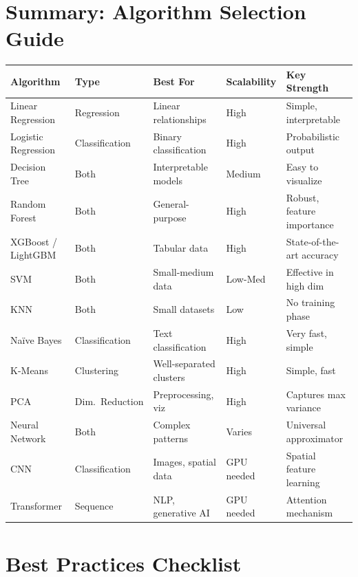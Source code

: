 \documentclass[11pt,a4paper]{article}
\begin{document}
\section{Summary: Algorithm Selection Guide}

\begin{center}
\small
{}
\begin{longtable}{@{}p{2.8cm}p{2.2cm}p{2.5cm}p{2cm}p{3.5cm}@{}}
\toprule
\rowcolor{primary!15}
\textbf{Algorithm} & \textbf{Type} & \textbf{Best For} & \textbf{Scalability} & \textbf{Key Strength} \\
\midrule
\endhead
Linear Regression & Regression & Linear relationships & High & Simple, interpretable \\
Logistic Regression & Classification & Binary classification & High & Probabilistic output \\
\addlinespace
Decision Tree & Both & Interpretable models & Medium & Easy to visualize \\
Random Forest & Both & General-purpose & High & Robust, feature importance \\
\addlinespace
XGBoost / LightGBM & Both & Tabular data & High & State-of-the-art accuracy \\
SVM & Both & Small-medium data & Low-Med & Effective in high dim \\
\addlinespace
KNN & Both & Small datasets & Low & No training phase \\
Na\"ive Bayes & Classification & Text classification & High & Very fast, simple \\
\addlinespace
K-Means & Clustering & Well-separated clusters & High & Simple, fast \\
PCA & Dim.\ Reduction & Preprocessing, viz & High & Captures max variance \\
\addlinespace
Neural Network & Both & Complex patterns & Varies & Universal approximator \\
CNN & Classification & Images, spatial data & GPU needed & Spatial feature learning \\
Transformer & Sequence & NLP, generative AI & GPU needed & Attention mechanism \\
\bottomrule
\end{longtable}
\end{center}

\section{Best Practices Checklist}
\end{document}
